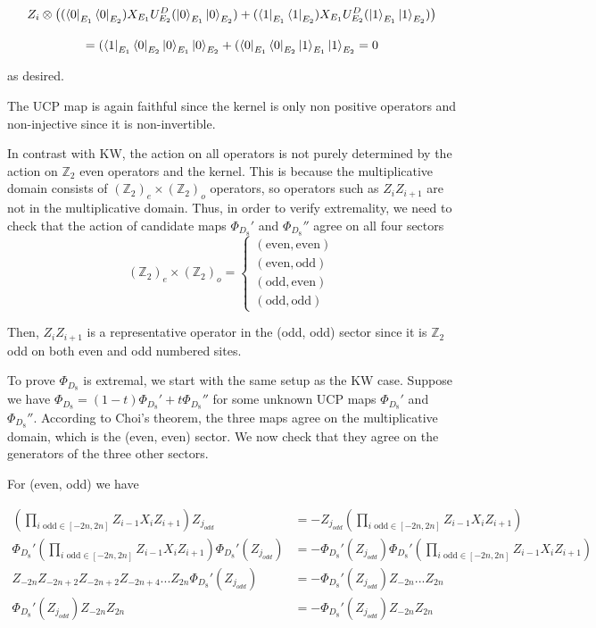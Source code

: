 \documentclass{article}
\theoremstyle{definition}
\begin{document}
\[Z_i \otimes \big( (\bra{0}_{E_1} \bra{0}_{E_2}) X_{E_1} U^D_{E_2} (\ket{0}_{E_1} \ket{0}_{E_2}) + (\bra{1}_{E_1} \bra{1}_{E_2}) X_{E_1} U^D_{E_2} (\ket{1}_{E_1} \ket{1}_{E_2})\big)\]

\[= (\bra{1}_{E_1} \bra{0}_{E_2}\ket{0}_{E_1} \ket{0}_{E_2} + (\bra{0}_{E_1} \bra{0}_{E_2}\ket{1}_{E_1} \ket{1}_{E_2}  = 0\]

as desired.


The UCP map is again faithful since the kernel is only non positive operators and non-injective since it is non-invertible. 

In contrast with KW, the action on all operators is not purely determined by the action on $\mathbb{Z}_2$ even operators and the kernel.  This is because the multiplicative domain consists of $(\mathbb{Z}_{2})_e \times (\mathbb{Z}_{2})_o$ operators, so operators such as $Z_iZ_{i+1}$ are not in the multiplicative domain.  Thus, in order to verify extremality, we need to check that the action of candidate maps $\Phi_{D_8}'$ and $\Phi_{D_8}''$ agree on all four sectors \[(\mathbb{Z}_{2})_e \times (\mathbb{Z}_{2})_o = \begin{cases}
    (\text{even},\text{even})\\
    (\text{even},\text{odd})\\
    (\text{odd},\text{even})\\
    (\text{odd},\text{odd})
\end{cases}\]


Then, $Z_iZ_{i+1}$ is a representative operator in the (odd, odd) sector since it is $\mathbb{Z}_2$ odd on both even and odd numbered sites.

To prove $\Phi_{D_8}$ is extremal, we start with the same setup as the KW case.  Suppose we have $\Phi_{D_8} = (1-t)\Phi_{D_8}' + t\Phi_{D_8}''$ for some unknown UCP maps $\Phi_{D_8}'$ and $\Phi_{D_8}''$.  According to Choi's theorem, the three maps agree on the multiplicative domain, which is the (even, even) sector.  We now check that they agree on the generators of the three other sectors.

For (even, odd) we have 

\begin{align}
    (\prod_{i \text{ odd} \in [-2n,2n]} Z_{i-1}X_{i}Z_{i+1}) Z_{j_{odd}} &= -Z_{j_{odd}}(\prod_{i \text{ odd} \in [-2n,2n]} Z_{i-1}X_{i}Z_{i+1})\\
    \Phi_{D_8}'(\prod_{i \text{ odd} \in [-2n,2n]} Z_{i-1}X_{i}Z_{i+1}) \Phi_{D_8}'(Z_{j_{odd}}) &= -\Phi_{D_8}'(Z_{j_{odd}})\Phi_{D_8}'(\prod_{i \text{ odd} \in [-2n,2n]} Z_{i-1}X_{i}Z_{i+1}) \\
     Z_{-2n}Z_{-2n+2}Z_{-2n+2}Z_{-2n+4}...Z_{2n} \Phi_{D_8}'(Z_{j_{odd}}) &= -\Phi_{D_8}'(Z_{j_{odd}})Z_{-2n}...Z_{2n}\\
     \Phi_{D_8}'(Z_{j_{odd}}) Z_{-2n}Z_{2n}  &= -\Phi_{D_8}'(Z_{j_{odd}})Z_{-2n}Z_{2n}
\end{align}
\end{document}
